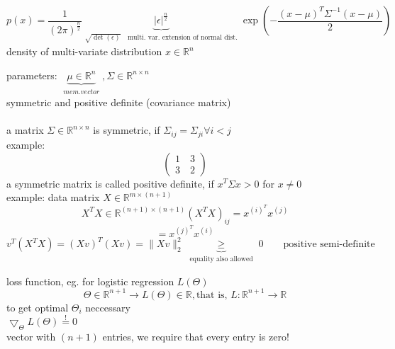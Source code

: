 \begin{enumerate}[(1)]
\begin{framed}
\[ p(x) = \frac{1}{(2\pi)^{\frac{n}{2}}} \underbrace{|\epsilon|^{\frac{n}{2}}}_{\substack{\sqrt{\det (\epsilon)} \quad \text{multi. var. extension of normal dist.}}}  \exp \left( - \frac{(x-\mu)^T \Sigma^{-1} (x-\mu)}{2} \right)\]
density of multi-variate distribution $x \in \mathbb{R}^n$
\end{framed}

parameters: $\underbrace{\mu \in \mathbb{R}^n}_{\substack{mem. vector}}, \Sigma \in \mathbb{R}^{n \times n}$\\
symmetric and positive definite (covariance matrix)\\\\
a matrix $\Sigma \in \mathbb{R}^{n \times n}$ is symmetric, if $\Sigma_{ij} = \Sigma_{ji} \forall i<j$\\
example: 
\[ \left( \begin{array}{ccc}
1 \quad 3 \\
3 \quad 2 \end{array} \right)\]
a symmetric matrix is called positive definite, if $x^T \Sigma x > 0$ for $x \neq 0$\\

example: data matrix $X \in \mathbb{R}^{m \times (n+1)}$
\[X^T X \in \mathbb{R}^{(n+1) \times (n+1)} (X^T X)_{ij} = x^{(i)^T}x^{(j)}\]
\[ = x^{(j)^T} x ^{(i)}\]
\[v^T(X^T X) = (Xv)^T (Xv)= \lVert Xv\lVert^2_2  \underbrace{\geq}_{\substack{\text{equality also allowed}}} 0 \quad\quad \text{positive semi-definite}\]
\end{enumerate}
loss function, eg. for logistic regression $L(\Theta)$
\[\Theta \in \mathbb{R}^{n+1} \rightarrow L(\Theta) \in \mathbb{R}, \text{that is, } L:\mathbb{R}^{n+1} \rightarrow \mathbb{R}\]
to get optimal $\Theta_i$ neccessary\\
$\bigtriangledown_\Theta L(\Theta) \stackrel{!}{=} 0$\\
vector with $(n+1)$ entries, we require that every entry is zero!
